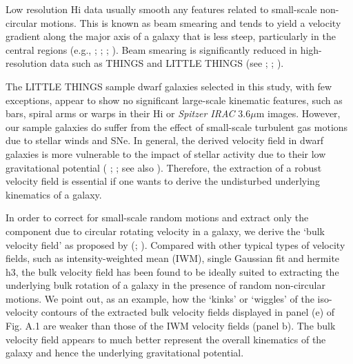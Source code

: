 \documentclass[natbib209]{emulateapj}
\begin{document}
Low resolution H{\sc i} data usually smooth any features related to small-scale
non-circular motions. This is known as beam smearing and tends to yield a velocity 
gradient along the major axis of a galaxy that is less steep, particularly in the
central regions (e.g., \citeauthor{deBlok_1997} \citeyear{deBlok_1997};
\citeauthor{Swaters_2000} \citeyear{Swaters_2000};
\citeauthor{van_den_Bosch_2001} \citeyear{van_den_Bosch_2001};  
\citeauthor{McGaugh_2001} \citeyear{McGaugh_2001}).  
Beam smearing is significantly reduced in high-resolution
data such as THINGS and LITTLE THINGS (see \citeauthor{deBlok_2001}
\citeyear{deBlok_2001}; \citeauthor{McGaugh_2001} \citeyear{McGaugh_2001};
\citeauthor{Kuzio_de_Naray_2006} \citeyear{Kuzio_de_Naray_2006}).

The LITTLE THINGS sample dwarf galaxies selected in this study, with few exceptions, appear 
to show no significant large-scale kinematic features, such as bars,
spiral arms or warps in their H{\sc i} or {\it Spitzer IRAC} 3.6$\mu$m images.
However, our sample galaxies do suffer from the effect of small-scale turbulent 
gas motions due to stellar winds and SNe. In general, the derived velocity
field in dwarf galaxies is more vulnerable to the impact of stellar activity due to
their low gravitational potential (\citeauthor{Walter_1998} \citeyear{Walter_1998};
\citeauthor{Walter_2001} \citeyear{Walter_2001}; see also
\citeauthor{Bagetakos_2011} \citeyear{Bagetakos_2011}).
Therefore, the extraction of a robust velocity field is essential if one wants to
derive the undisturbed underlying kinematics of a galaxy.

In order to correct for small-scale random motions and extract only the
component due to circular rotating velocity  in a galaxy, we derive the 
`bulk velocity field' as proposed by \citeauthor{Oh_2008} (\citeyear{Oh_2008}; \citeyear{Oh_2011a}).
Compared with other typical types of velocity fields, such as intensity-weighted
mean (IWM), single Gaussian fit and hermite h3, the bulk velocity field has been
found to be ideally suited to extracting the underlying bulk rotation of a galaxy in 
the presence of random non-circular motions. We point out, as an example, 
how the `kinks' or `wiggles' of the iso-velocity contours of the extracted bulk velocity
fields displayed in panel (e) of Fig. A.1
are weaker than those of the IWM velocity fields (panel b). The bulk
velocity field appears to much better represent the overall kinematics of the galaxy
and hence the underlying gravitational potential.
\end{document}
